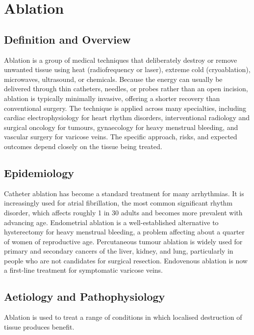 \chapter{Ablation}

\section*{Definition and Overview}
Ablation is a group of medical techniques that deliberately destroy or remove unwanted tissue using heat (radiofrequency or laser), extreme cold (cryoablation), microwaves, ultrasound, or chemicals. Because the energy can usually be delivered through thin catheters, needles, or probes rather than an open incision, ablation is typically minimally invasive, offering a shorter recovery than conventional surgery. The technique is applied across many specialties, including cardiac electrophysiology for heart rhythm disorders, interventional radiology and surgical oncology for tumours, gynaecology for heavy menstrual bleeding, and vascular surgery for varicose veins. The specific approach, risks, and expected outcomes depend closely on the tissue being treated.

\section*{Epidemiology}
Catheter ablation has become a standard treatment for many arrhythmias. It is increasingly used for atrial fibrillation, the most common significant rhythm disorder, which affects roughly 1 in 30 adults and becomes more prevalent with advancing age. Endometrial ablation is a well-established alternative to hysterectomy for heavy menstrual bleeding, a problem affecting about a quarter of women of reproductive age. Percutaneous tumour ablation is widely used for primary and secondary cancers of the liver, kidney, and lung, particularly in people who are not candidates for surgical resection. Endovenous ablation is now a first-line treatment for symptomatic varicose veins.

\section*{Aetiology and Pathophysiology}
Ablation is used to treat a range of conditions in which localised destruction of tissue produces benefit.

